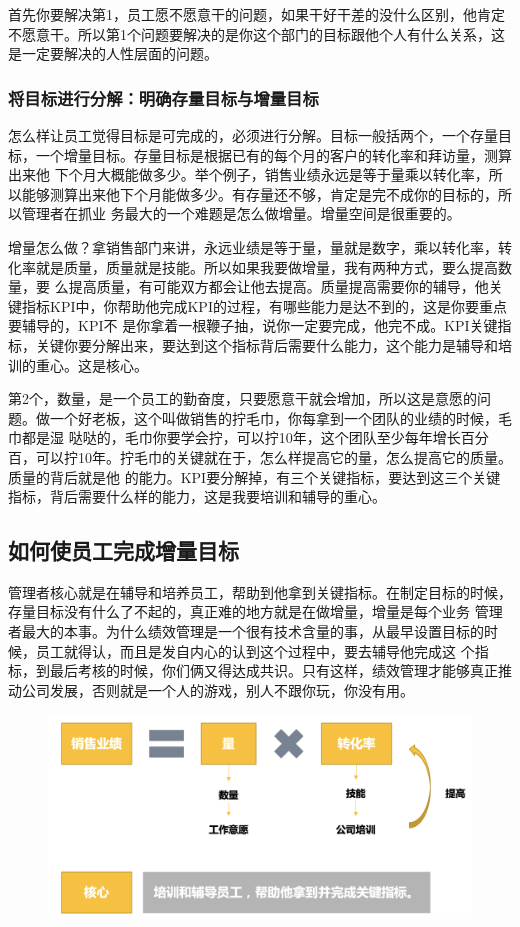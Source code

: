 \documentclass[12pt]{article}
\begin{document}
首先你要解决第1，员工愿不愿意干的问题，如果干好干差的没什么区别，他肯定不愿意干。所以第1个问题要解决的是你这个部门的目标跟他个人有什么关系，这是一定要解决的人性层面的问题。

\subsubsection{将目标进行分解：明确存量目标与增量目标}
怎么样让员工觉得目标是可完成的，必须进行分解。目标一般括两个，一个存量目标，一个增量目标。存量目标是根据已有的每个月的客户的转化率和拜访量，测算出来他 下个月大概能做多少。举个例子，销售业绩永远是等于量乘以转化率，所以能够测算出来他下个月能做多少。有存量还不够，肯定是完不成你的目标的，所以管理者在抓业 务最大的一个难题是怎么做增量。增量空间是很重要的。

增量怎么做？拿销售部门来讲，永远业绩是等于量，量就是数字，乘以转化率，转化率就是质量，质量就是技能。所以如果我要做增量，我有两种方式，要么提高数量，要 么提高质量，有可能双方都会让他去提高。质量提高需要你的辅导，他关键指标KPI中，你帮助他完成KPI的过程，有哪些能力是达不到的，这是你要重点要辅导的，KPI不 是你拿着一根鞭子抽，说你一定要完成，他完不成。KPI关键指标，关键你要分解出来，要达到这个指标背后需要什么能力，这个能力是辅导和培训的重心。这是核心。

第2个，数量，是一个员工的勤奋度，只要愿意干就会增加，所以这是意愿的问题。做一个好老板，这个叫做销售的拧毛巾，你每拿到一个团队的业绩的时候，毛巾都是湿 哒哒的，毛巾你要学会拧，可以拧10年，这个团队至少每年增长百分百，可以拧10年。拧毛巾的关键就在于，怎么样提高它的量，怎么提高它的质量。质量的背后就是他 的能力。KPI要分解掉，有三个关键指标，要达到这三个关键指标，背后需要什么样的能力，这是我要培训和辅导的重心。

\subsection{如何使员工完成增量目标}
管理者核心就是在辅导和培养员工，帮助到他拿到关键指标。在制定目标的时候，存量目标没有什么了不起的，真正难的地方就是在做增量，增量是每个业务 管理者最大的本事。为什么绩效管理是一个很有技术含量的事，从最早设置目标的时候，员工就得认，而且是发自内心的认到这个过程中，要去辅导他完成这 个指标，到最后考核的时候，你们俩又得达成共识。只有这样，绩效管理才能够真正推动公司发展，否则就是一个人的游戏，别人不跟你玩，你没有用。
\begin{figure}[H]
    \centering
    \includegraphics[width=1\textwidth]{fig/Ali_Performance_10.png}
\end{figure}
\end{document}
